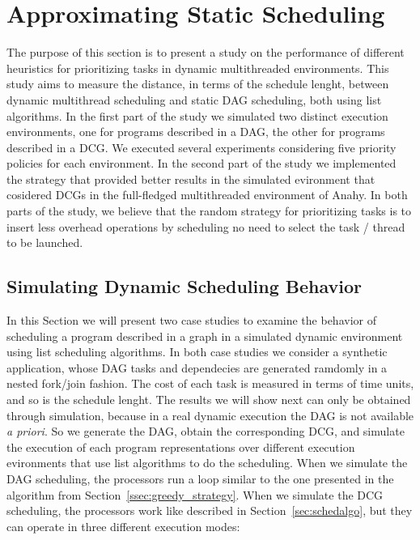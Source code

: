 \documentclass[twocolumn]{svjour3}
\begin{document}
\section{Approximating Static Scheduling} \label{sec:practical_results}

The purpose of this section is to present a study on the performance of different heuristics for prioritizing tasks in dynamic multithreaded environments. This study aims to measure the distance, in terms of the schedule lenght, between dynamic multithread scheduling and static DAG scheduling, both using list algorithms. In the first part of the study we simulated two distinct execution environments, one for programs described in a DAG, the other for programs described in a DCG. We executed several experiments considering five priority policies for each environment. In the second part of the study we implemented the strategy that provided better results in the simulated evironment that cosidered DCGs in the full-fledged multithreaded environment of Anahy. In both parts of the study, we believe that the random strategy for prioritizing tasks is to insert less overhead operations by scheduling no need to select the task / thread to be launched.

\subsection{Simulating Dynamic Scheduling Behavior}

In this Section we will present two case studies to examine the behavior of scheduling a program described in a graph in a simulated dynamic environment using list scheduling algorithms. In both case studies we consider a synthetic application, whose DAG tasks and dependecies are generated ramdomly in a nested fork/join fashion. The cost of each task is measured in terms of time units, and so is the schedule lenght. The results we will show next can only be obtained through simulation, because in a real dynamic execution the DAG is not available \emph{a priori}. So we generate the DAG, obtain the corresponding DCG, and simulate the execution of each program representations over different execution evironments that use list algorithms to do the scheduling. When we simulate the DAG scheduling, the processors run a loop similar to the one presented in the algorithm from Section~\ref{ssec:greedy_strategy}. When we simulate the DCG scheduling, the processors work like described in Section~\ref{sec:schedalgo}, but they can operate in three different execution modes:
\end{document}
